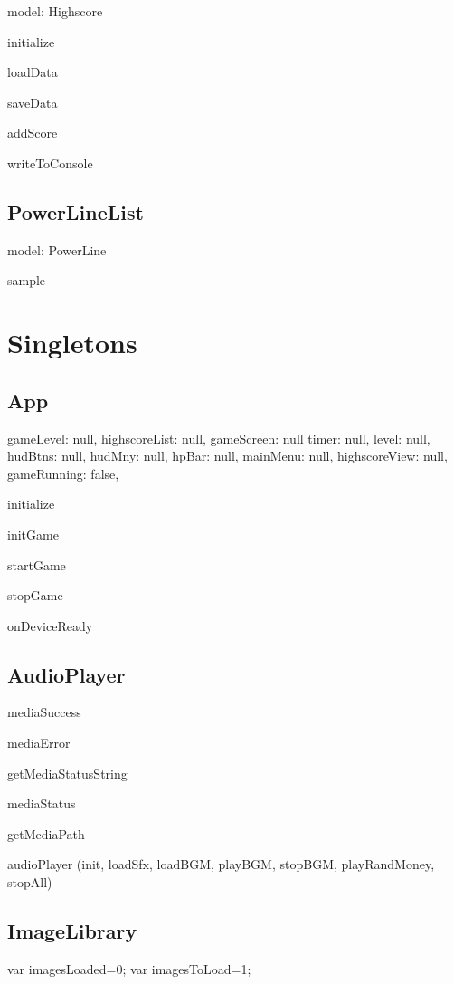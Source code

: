 	model: Highscore

	initialize

	loadData

	saveData

	addScore

	writeToConsole

\subsection*{PowerLineList}

	model: PowerLine

	sample

\clearpage

\section{Singletons}

\subsection*{App}

	gameLevel: null,
  	highscoreList: null,
  	gameScreen: null
  	timer: null,
  	level: null,
  	hudBtns: null,
  	hudMny: null,
  	hpBar: null,
  	mainMenu: null,
  	highscoreView: null,
  	gameRunning: false,

  	initialize

  	initGame

  	startGame

  	stopGame

  	onDeviceReady

\subsection*{AudioPlayer}

	mediaSuccess

	mediaError

	getMediaStatusString

	mediaStatus

	getMediaPath

	audioPlayer (init, loadSfx, loadBGM, playBGM, stopBGM, playRandMoney, stopAll)

\subsection*{ImageLibrary}
	
	var imagesLoaded=0;
	var imagesToLoad=1;

